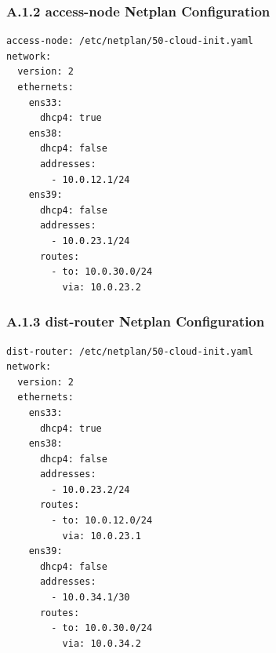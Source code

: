 \documentclass[11pt]{article}
\begin{document}

\subsubsection{A.1.2 access-node Netplan Configuration}
\label{sec:appendix-a-access-node-netplan-config}

\begin{verbatim}
access-node: /etc/netplan/50-cloud-init.yaml
network:
  version: 2
  ethernets:
    ens33:
      dhcp4: true
    ens38:
      dhcp4: false
      addresses:
        - 10.0.12.1/24
    ens39:
      dhcp4: false
      addresses:
        - 10.0.23.1/24
      routes:
        - to: 10.0.30.0/24
          via: 10.0.23.2
\end{verbatim}


\subsubsection{A.1.3 dist-router Netplan Configuration}
\label{sec:appendix-a-dist-router-netplan-config}

\begin{verbatim}
dist-router: /etc/netplan/50-cloud-init.yaml
network:
  version: 2
  ethernets:
    ens33:
      dhcp4: true
    ens38:
      dhcp4: false
      addresses:
        - 10.0.23.2/24
      routes:
        - to: 10.0.12.0/24
          via: 10.0.23.1
    ens39:
      dhcp4: false
      addresses:
        - 10.0.34.1/30
      routes:
        - to: 10.0.30.0/24
          via: 10.0.34.2
\end{verbatim}
\end{document}
